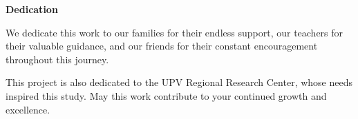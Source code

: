 \begin{center}
	\textbf{Dedication}
\end{center}


We dedicate this work to our families for their endless support, our teachers for their valuable guidance, and our friends for their constant encouragement throughout this journey.

This project is also dedicated to the UPV Regional Research Center, whose needs inspired this study. May this work contribute to your continued growth and excellence.